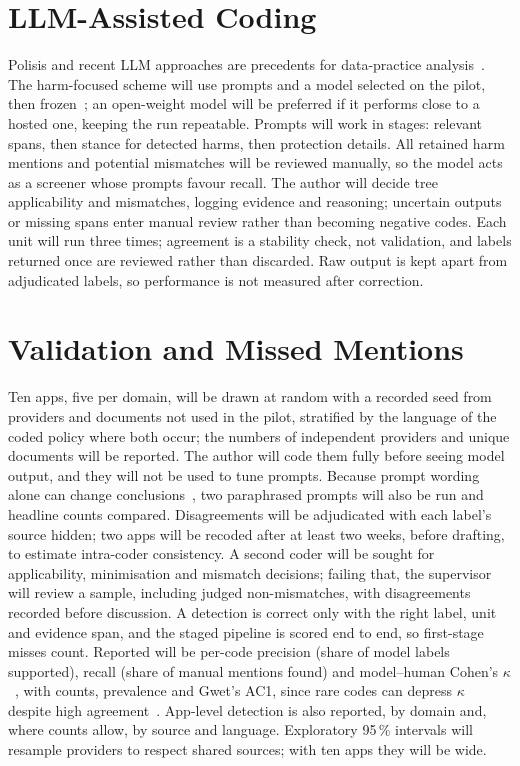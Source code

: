 \documentclass[twoside,its]{bossthesis}
\begin{document}
\section{LLM-Assisted Coding} Polisis and recent LLM approaches are precedents for
data-practice analysis~\parencite{harkous2018polisis,rodriguez2024llm}. The
harm-focused scheme will use prompts and a model selected on the pilot, then
frozen~\parencite{tornberg2024best}; an open-weight model will be preferred if
it performs close to a hosted one, keeping the run repeatable. Prompts will
work in stages: relevant spans, then stance for detected harms, then
protection details. All retained harm mentions and potential mismatches will
be reviewed manually, so the model acts as a screener whose prompts favour
recall. The author will decide tree applicability and mismatches, logging
evidence and reasoning; uncertain outputs or missing spans enter manual
review rather than becoming negative codes. Each unit will run three times;
agreement is a stability check, not validation, and labels returned once are
reviewed rather than discarded. Raw output is kept apart from adjudicated
labels, so performance is not measured after correction.

\section{Validation and Missed Mentions} Ten apps, five per domain, will be
drawn at random with a recorded seed from providers and documents not used in
the pilot, stratified by the language of the coded policy where both occur;
the numbers of independent providers and unique documents will be reported.
The author will code them fully before seeing model output, and they will not
be used to tune prompts. Because prompt wording alone can change
conclusions~\parencite{baumann2025llm}, two paraphrased prompts will also be
run and headline counts compared. Disagreements will be adjudicated with each
label's source hidden; two apps will be recoded after at least two weeks,
before drafting, to estimate intra-coder consistency. A second coder will be
sought for applicability, minimisation and mismatch decisions; failing that,
the supervisor will review a sample, including judged non-mismatches, with
disagreements recorded before discussion. A detection is correct only with
the right label, unit and evidence span, and the staged pipeline is scored end
to end, so first-stage misses count. Reported will be per-code precision
(share of model labels supported), recall (share of manual mentions found)
and model--human Cohen's $\kappa$~\parencite{cohen1960coefficient}, with
counts, prevalence and Gwet's AC1, since rare codes can depress $\kappa$
despite high agreement~\parencite{feinstein1990high,gwet2008computing}.
App-level detection is also reported, by domain and, where counts allow, by
source and language. Exploratory 95\,\% intervals will resample providers to
respect shared sources; with ten apps they will be wide.
\end{document}
